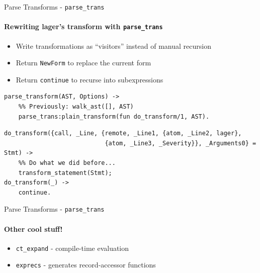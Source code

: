 \documentclass[c]{beamer}
\begin{document}
\begin{frame}[fragile]{Parse Transforms - \texttt{parse\_trans}}
  \framesubtitle{Rewriting lager's transform with \texttt{parse\_trans}}
  \begin{itemize}
  \item Write transformations as ``visitors'' instead of manual recursion
  \item Return \texttt{NewForm} to replace the current form
  \item Return \texttt{continue} to recurse into subexpressions
  \end{itemize}

  \begin{lstlisting}
parse_transform(AST, Options) ->
    %% Previously: walk_ast([], AST)
    parse_trans:plain_transform(fun do_transform/1, AST).
  \end{lstlisting}
  \pause
  \begin{lstlisting}
do_transform({call, _Line, {remote, _Line1, {atom, _Line2, lager},
                            {atom, _Line3, _Severity}}, _Arguments0} = Stmt) ->
    %% Do what we did before...
    transform_statement(Stmt);
do_transform(_) ->
    continue.
  \end{lstlisting}
\end{frame}

\begin{frame}{Parse Transforms - \texttt{parse\_trans}}
  \framesubtitle{Other cool stuff!}
  \begin{itemize}
  \item \texttt{ct\_expand} - compile-time evaluation
  \item \texttt{exprecs} - generates record-accessor functions
  \end{itemize}
\end{frame}
\end{document}
